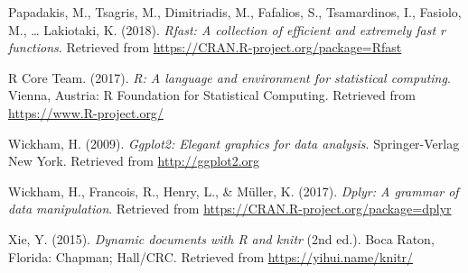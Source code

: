 \documentclass[floatsintext,man]{apa6}
\theoremstyle{definition}
\theoremstyle{definition}
\theoremstyle{definition}
\theoremstyle{remark}
\begin{document}
\hypertarget{ref-R-Rfast}{}
Papadakis, M., Tsagris, M., Dimitriadis, M., Fafalios, S., Tsamardinos,
I., Fasiolo, M., \ldots{} Lakiotaki, K. (2018). \emph{Rfast: A
collection of efficient and extremely fast r functions}. Retrieved from
\url{https://CRAN.R-project.org/package=Rfast}

\hypertarget{ref-R-base}{}
R Core Team. (2017). \emph{R: A language and environment for statistical
computing}. Vienna, Austria: R Foundation for Statistical Computing.
Retrieved from \url{https://www.R-project.org/}

\hypertarget{ref-R-ggplot2}{}
Wickham, H. (2009). \emph{Ggplot2: Elegant graphics for data analysis}.
Springer-Verlag New York. Retrieved from \url{http://ggplot2.org}

\hypertarget{ref-R-dplyr}{}
Wickham, H., Francois, R., Henry, L., \& Müller, K. (2017). \emph{Dplyr:
A grammar of data manipulation}. Retrieved from
\url{https://CRAN.R-project.org/package=dplyr}

\hypertarget{ref-R-knitr}{}
Xie, Y. (2015). \emph{Dynamic documents with R and knitr} (2nd ed.).
Boca Raton, Florida: Chapman; Hall/CRC. Retrieved from
\url{https://yihui.name/knitr/}

\endgroup
\end{document}
